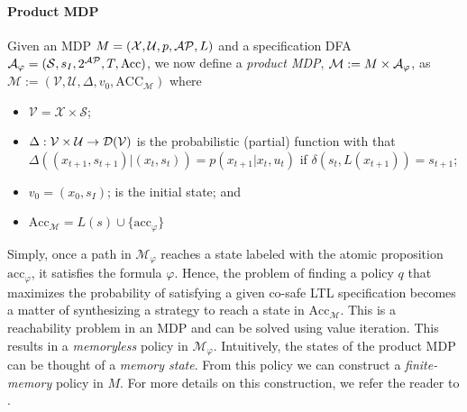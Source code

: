 \paragraph*{Product MDP}
Given an MDP $M=(\mathcal{X},\mathcal{U},p,\mathcal{AP},L)$ and a specification DFA
$\mathcal{A}_{\varphi} = (\mathcal{S},s_I,2^{\mathcal{AP}}, T,\textrm{Acc})$, we now define a \emph{product
MDP}, $\mathcal{M} := M \times\mathcal{A}_{\varphi}$, as $\mathcal{M}
:= (\mathcal{V},\mathcal{U}, \Delta,v_0,\textrm{ACC}_{\mathcal{M}})$ where
\begin{itemize}
	\item $\mathcal{V} = \mathcal{X} \times \mathcal{S}$;
	\item $\Delta: \mathcal{V} \times \mathcal{U} \rightarrow \mathcal{D}(\mathcal{V})$ is the probabilistic
		(partial) function with
		that $\Delta\left((x_{t+1},s_{t+1})\vert (x_t,s_t)\right) = p(x_{t+1} \vert x_t,u_t ) $ if $\delta(s_t,L(x_{t+1}))
		= s_{t+1}$;
	\item $v_0 = (x_0,s_I)$; is the initial state; and
	\item $\textrm{Acc}_{\mathcal{M}} = L(s) \cup \{\textrm{acc}_\varphi\}$
\end{itemize}
Simply, once a path in $\mathcal{M}_{\varphi}$ reaches a state labeled with the atomic proposition $\textrm{acc}_\varphi$, it satisfies the formula $\varphi$.  Hence, the problem of finding a policy $q$ that maximizes the probability of satisfying a given co-safe LTL specification becomes a matter of synthesizing a strategy to reach a state in $\textrm{Acc}_{\mathcal{M}}$. This is a reachability problem in an MDP and can be solved using value iteration. This results in a \emph{memoryless} policy in $\mathcal{M}_\varphi$. Intuitively, the states of the product MDP can be thought of a \emph{memory state}. From this policy we can construct a \emph{finite-memory} policy in $M$. For more details on this construction, we refer the reader to  \cite{forejt2011automated}.


